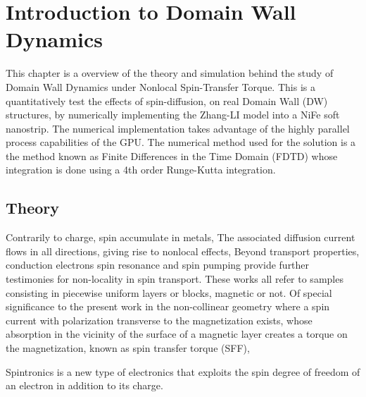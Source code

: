 
\chapter{Introduction to Domain Wall Dynamics} %

\label{Introduction to Domain Wall Dynamics} %


This chapter is a overview of the theory and simulation behind the study of Domain Wall Dynamics under Nonlocal Spin-Transfer Torque. This is a quantitatively test the effects of spin-diffusion, on real Domain Wall (DW) structures, by numerically implementing the Zhang-LI model into a NiFe soft nanostrip. The numerical implementation takes advantage of the highly parallel process capabilities of the GPU. The numerical method used for the solution is a the method known as Finite Differences in the Time Domain (FDTD) whose integration is done using a 4th order Runge-Kutta integration.


\section{Theory}

 \cite{claudio}

Contrarily to charge, spin accumulate in metals, The associated diffusion current flows in all directions, giving rise to nonlocal effects, Beyond transport properties, conduction electrons spin resonance and spin pumping provide further testimonies for non-locality in spin transport. These works all refer  to samples consisting in piecewise uniform layers or blocks, magnetic or not. Of special significance to the present work in the non-collinear geometry where a spin current with polarization transverse to the magnetization exists, whose absorption in the vicinity of the surface of a magnetic layer creates a torque on the magnetization, known as spin transfer torque (SFF),  \cite{claudio}

Spintronics is a new type of electronics that exploits the spin degree of freedom of an electron in addition to its charge. \cite{spinz}

